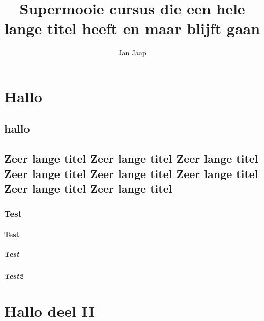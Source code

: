\documentclass[11pt,dutch,faculty=ea,layout=titlefont,underline=false,titleUppercase=true,titleUnderline=true]{ugent2016-report}
\author{Jan Jaap}
\title{Supermooie cursus die een hele lange titel heeft en maar blijft gaan}
\begin{document}
    \maketitle
    \tableofcontents

    \part{Hallo}
    \chapter{hallo}
    \lipsum
    \chapter{Zeer lange titel Zeer lange titel Zeer lange titel Zeer lange titel Zeer lange titel Zeer lange titel Zeer lange titel Zeer lange titel}
    \section{Test}
    \lipsum[3]
    \subsection{Test}
    \lipsum
    \subsubsection{Test}
    \lipsum
    \subsubsection{Test2}
    \lipsum[2]
    \part{Hallo deel II}
    \lipsum[5]
\end{document}
